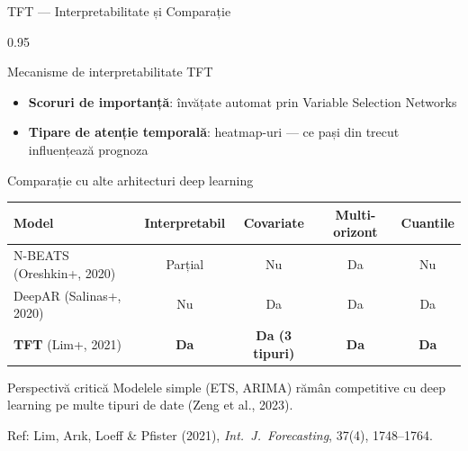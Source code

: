 \documentclass[9pt, aspectratio=169, t]{beamer}
\begin{document}
\begin{frame}{TFT --- Interpretabilitate și Comparație}
    \vspace{-2mm}
    \begin{cminipage}{0.95\textwidth}
        {\scriptsize
        \begin{block}{Mecanisme de interpretabilitate TFT}
            \begin{itemize}\setlength{\itemsep}{0pt}
                \item \textbf{Scoruri de importanță}: învățate automat prin Variable Selection Networks
                \item \textbf{Tipare de atenție temporală}: heatmap-uri --- ce pași din trecut influențează prognoza
            \end{itemize}
        \end{block}
        \vspace{-2mm}
        \begin{block}{Comparație cu alte arhitecturi deep learning}
            \begin{center}
            {\footnotesize
            \begin{tabular}{l|c|c|c|c}
                \toprule
                \textbf{Model} & \textbf{Interpretabil} & \textbf{Covariate} & \textbf{Multi-orizont} & \textbf{Cuantile} \\
                \midrule
                N-BEATS (Oreshkin+, 2020) & Parțial & Nu & Da & Nu \\
                DeepAR (Salinas+, 2020) & Nu & Da & Da & Da \\
                \textbf{TFT} (Lim+, 2021) & \textbf{Da} & \textbf{Da (3 tipuri)} & \textbf{Da} & \textbf{Da} \\
                \bottomrule
            \end{tabular}
            }
            \end{center}
        \end{block}
        \vspace{-2mm}
        \begin{alertblock}{Perspectivă critică}
            Modelele simple (ETS, ARIMA) rămân competitive cu deep learning pe multe tipuri de date (Zeng et al., 2023).
        \end{alertblock}
        {\tiny Ref: Lim, Ar{\i}k, Loeff \& Pfister (2021), \textit{Int.\ J.\ Forecasting}, 37(4), 1748--1764.}
        }
    \end{cminipage}
\end{frame}
\end{document}
